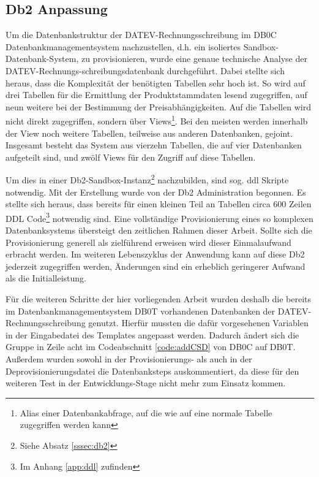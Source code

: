 \subsection{Db2 Anpassung}\label{ssec:db2entw}
Um die Datenbankstruktur der DATEV-Rechnungsschreibung im DB0C Datenbankmanagementsystem nachzustellen, d.h. ein isoliertes Sandbox-Datenbank-System, zu provisionieren, wurde eine genaue technische Analyse der DATEV-Rechnungs-schreibungsdatenbank durchgeführt.
Dabei stellte sich heraus, dass die Komplexität der benötigten Tabellen sehr hoch ist.
So wird auf drei Tabellen für die Ermittlung der Produktstammdaten lesend zugegriffen, auf neun weitere bei der Bestimmung der Preisabhängigkeiten.
Auf die Tabellen wird nicht direkt zugegriffen, sondern über Views\footnote{Alias einer Datenbankabfrage, auf die wie auf eine normale Tabelle zugegriffen werden kann}.
Bei den meisten werden innerhalb der View noch weitere Tabellen, teilweise aus anderen Datenbanken, gejoint.
Insgesamt besteht das System aus vierzehn Tabellen, die auf vier Datenbanken aufgeteilt sind, und zwölf Views für den Zugriff auf diese Tabellen.

Um dies in einer Db2-Sandbox-Instanz\footnote{Siehe Absatz \ref{sssec:db2}} nachzubilden, sind sog. \Gls{ddl} Skripte notwendig. 
Mit der Erstellung wurde von der Db2 Administration begonnen.
Es stellte sich heraus, dass bereits für einen kleinen Teil an Tabellen circa 600 Zeilen DDL Code\footnote{Im Anhang \ref{app:ddl} zufinden} notwendig sind.
Eine vollständige Provisionierung eines so komplexen Datenbanksystems übersteigt den zeitlichen Rahmen dieser Arbeit.
Sollte sich die Provisionierung generell als zielführend erweisen wird dieser Einmalaufwand erbracht werden.
Im weiteren Lebenszyklus der Anwendung kann auf diese Db2 jederzeit zugegriffen werden, Änderungen sind ein erheblich geringerer Aufwand als die Initialleistung.

Für die weiteren Schritte der hier vorliegenden Arbeit wurden deshalb die bereits im Datenbankmanagementsystem DB0T vorhandenen Datenbanken der DATEV-Rechnungsschreibung genutzt.
Hierfür mussten die dafür vorgesehenen Variablen in der Eingabedatei des Templates angepasst werden.
Dadurch ändert sich die Gruppe in Zeile acht im Codeabschnitt \ref{code:addCSD} von \glqq DB0C\grqq{} auf \glqq DB0T\grqq.
Außerdem wurden sowohl in der Provisionierungs- als auch in der Deprovisionierungsdatei die Datenbanksteps auskommentiert, da diese für den weiteren Test in der Entwicklungs-Stage nicht mehr zum Einsatz kommen.

